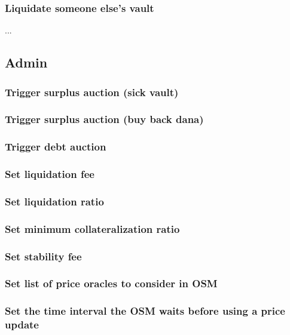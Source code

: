 \documentclass{article} %
\begin{document}
\subsubsection{Liquidate someone else's vault}

...

\subsection{Admin}

\subsubsection{Trigger surplus auction (sick vault)}

\subsubsection{Trigger surplus auction (buy back dana)}

\subsubsection{Trigger debt auction}

\subsubsection{Set liquidation fee}

\subsubsection{Set liquidation ratio}

\subsubsection{Set minimum collateralization ratio}

\subsubsection{Set stability fee}

\subsubsection{Set list of price oracles to consider in OSM}

\subsubsection{Set the time interval the OSM waits before using a price update}
\end{document}
